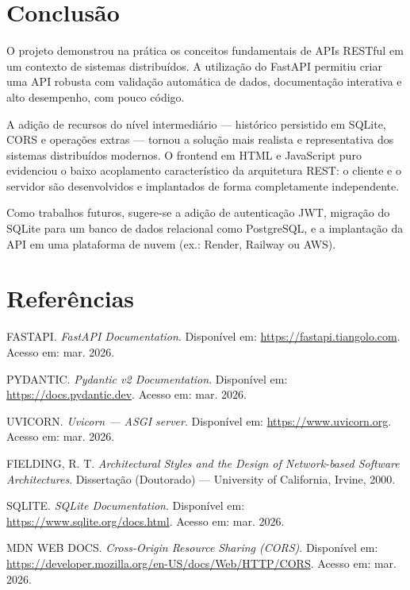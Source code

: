 \documentclass[12pt, a4paper]{article}
\begin{document}
\section{Conclusão}

O projeto demonstrou na prática os conceitos fundamentais de APIs RESTful em um contexto de sistemas distribuídos. A utilização do FastAPI permitiu criar uma API robusta com validação automática de dados, documentação interativa e alto desempenho, com pouco código.

A adição de recursos do nível intermediário — histórico persistido em SQLite, CORS e operações extras — tornou a solução mais realista e representativa dos sistemas distribuídos modernos. O frontend em HTML e JavaScript puro evidenciou o baixo acoplamento característico da arquitetura REST: o cliente e o servidor são desenvolvidos e implantados de forma completamente independente.

Como trabalhos futuros, sugere-se a adição de autenticação JWT, migração do SQLite para um banco de dados relacional como PostgreSQL, e a implantação da API em uma plataforma de nuvem (ex.: Render, Railway ou AWS).

\section*{Referências}

\begin{enumerate}[leftmargin=*, label={[\arabic*]}]
  \item FASTAPI. \textit{FastAPI Documentation}. Disponível em: \url{https://fastapi.tiangolo.com}. Acesso em: mar. 2026.
  \item PYDANTIC. \textit{Pydantic v2 Documentation}. Disponível em: \url{https://docs.pydantic.dev}. Acesso em: mar. 2026.
  \item UVICORN. \textit{Uvicorn — ASGI server}. Disponível em: \url{https://www.uvicorn.org}. Acesso em: mar. 2026.
  \item FIELDING, R. T. \textit{Architectural Styles and the Design of Network-based Software Architectures}. Dissertação (Doutorado) — University of California, Irvine, 2000.
  \item SQLITE. \textit{SQLite Documentation}. Disponível em: \url{https://www.sqlite.org/docs.html}. Acesso em: mar. 2026.
  \item MDN WEB DOCS. \textit{Cross-Origin Resource Sharing (CORS)}. Disponível em: \url{https://developer.mozilla.org/en-US/docs/Web/HTTP/CORS}. Acesso em: mar. 2026.
\end{enumerate}
\end{document}
